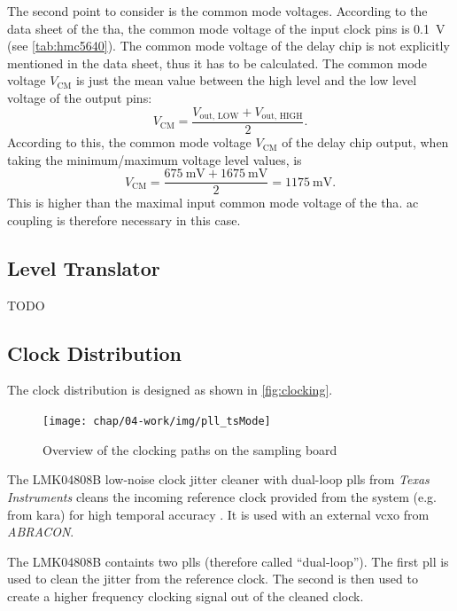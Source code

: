 The second point to consider is the common mode voltages. 
According to the data sheet of the \gls{tha}, the common mode voltage of the input clock pins is \SI{0.1}{\volt} (see \autoref{tab:hmc5640}).
The common mode voltage of the delay chip is not explicitly mentioned in the data sheet, thus it has to be calculated.
The common mode voltage $V_\text{CM}$ is just the mean value between the high level and the low level voltage of the output pins:
\begin{equation}
	V_\text{CM} = \frac{V_\text{out, LOW} + V_\text{out, HIGH}}{2}.
\end{equation}
According to this, the common mode voltage $V_{\text{CM}}$ of the delay chip output, when taking the minimum/maximum voltage level values, is 
\begin{equation}
	V_\text{CM} = \frac{\SI{675}{\milli \volt} + \SI{1675}{\milli \volt}}{2} = \SI{1175}{\milli \volt}.
\end{equation}
This is higher than the maximal input common mode voltage of the \gls{tha}.
\gls{ac} coupling is therefore necessary in this case.



\subsection{Level Translator}
TODO

\subsection{Clock Distribution}
The clock distribution is designed as shown in \autoref{fig:clocking}.
\begin{figure}[tbh]
	\centering
	\texttt{[image: chap/04-work/img/pll\_tsMode]}
	\caption{Overview of the clocking paths on the sampling board}
	\label{fig:clocking}
\end{figure}
The LMK04808B low-noise clock jitter cleaner with dual-loop \glspl{pll} from \textit{Texas Instruments} cleans the incoming reference clock provided from the system (e.g. from \gls{kara}) for high temporal accuracy \cite{caselle2013}.
It is used with an external \gls{vcxo} from \textit{ABRACON}. 

The LMK04808B containts two \glspl{pll} (therefore called ``dual-loop''). 
The first \gls{pll} is used to clean the jitter from the reference clock. 
The second is then used to create a higher frequency clocking signal out of the cleaned clock. 

